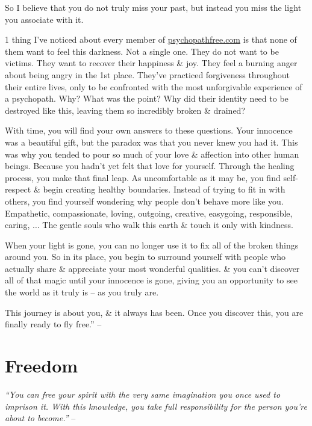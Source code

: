 \documentclass{article}
\numberwithin{equation}{section}
\begin{document}
So I believe that you do not truly miss your past, but instead you miss the light you associate with it.

1 thing I've noticed about every member of \url{psychopathfree.com} is that none of them want to feel this darkness. Not a single one. They do not want to be victims. They want to recover their happiness \& joy. They feel a burning anger about being angry in the 1st place. They've practiced forgiveness throughout their entire lives, only to be confronted with the most unforgivable experience of a psychopath. Why? What was the point? Why did their identity need to be destroyed like this, leaving them so incredibly broken \& drained?

With time, you will find your own answers to these questions. Your innocence was a beautiful gift, but the paradox was that you never knew you had it. This was why you tended to pour so much of your love \& affection into other human beings. Because you hadn't yet felt that love for yourself. Through the healing process, you make that final leap. As uncomfortable as it may be, you find self-respect \& begin creating healthy boundaries. Instead of trying to fit in with others, you find yourself wondering why people don't behave more like you. Empathetic, compassionate, loving, outgoing, creative, easygoing, responsible, caring, $\ldots$ The gentle souls who walk this earth \& touch it only with kindness.

When your light is gone, you can no longer use it to fix all of the broken things around you. So in its place, you begin to surround yourself with people who actually share \& appreciate your most wonderful qualities. \& you can't discover all of that magic until your innocence is gone, giving you an opportunity to see the world as it truly is -- as you truly are.

This journey is about you, \& it always has been. Once you discover this, you are finally ready to fly free.'' -- \cite[pp. 137--140]{MacKenzie2015}


\section{Freedom}
\textit{``You can free your spirit with the very same imagination you once used to imprison it. With this knowledge, you take full responsibility for the person you're about to become.''} -- \cite[p. 141]{MacKenzie2015}
\end{document}
